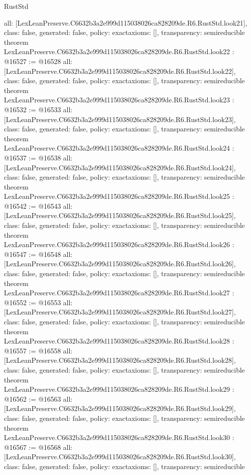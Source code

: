 \begin{lexlean}{RustStd}
\begin{coremodule}
{  all: [LexLeanPreserve.C6632b3a2e999d115038026ca828209de.R6.RustStd.look21],
  class: false,
  generated: false,
  policy: exact{axioms: []},
  transparency: semireducible
}
theorem LexLeanPreserve.C6632b3a2e999d115038026ca828209de.R6.RustStd.look22 : @16527 := @16528 {
  all: [LexLeanPreserve.C6632b3a2e999d115038026ca828209de.R6.RustStd.look22],
  class: false,
  generated: false,
  policy: exact{axioms: []},
  transparency: semireducible
}
theorem LexLeanPreserve.C6632b3a2e999d115038026ca828209de.R6.RustStd.look23 : @16532 := @16533 {
  all: [LexLeanPreserve.C6632b3a2e999d115038026ca828209de.R6.RustStd.look23],
  class: false,
  generated: false,
  policy: exact{axioms: []},
  transparency: semireducible
}
theorem LexLeanPreserve.C6632b3a2e999d115038026ca828209de.R6.RustStd.look24 : @16537 := @16538 {
  all: [LexLeanPreserve.C6632b3a2e999d115038026ca828209de.R6.RustStd.look24],
  class: false,
  generated: false,
  policy: exact{axioms: []},
  transparency: semireducible
}
theorem LexLeanPreserve.C6632b3a2e999d115038026ca828209de.R6.RustStd.look25 : @16542 := @16543 {
  all: [LexLeanPreserve.C6632b3a2e999d115038026ca828209de.R6.RustStd.look25],
  class: false,
  generated: false,
  policy: exact{axioms: []},
  transparency: semireducible
}
theorem LexLeanPreserve.C6632b3a2e999d115038026ca828209de.R6.RustStd.look26 : @16547 := @16548 {
  all: [LexLeanPreserve.C6632b3a2e999d115038026ca828209de.R6.RustStd.look26],
  class: false,
  generated: false,
  policy: exact{axioms: []},
  transparency: semireducible
}
theorem LexLeanPreserve.C6632b3a2e999d115038026ca828209de.R6.RustStd.look27 : @16552 := @16553 {
  all: [LexLeanPreserve.C6632b3a2e999d115038026ca828209de.R6.RustStd.look27],
  class: false,
  generated: false,
  policy: exact{axioms: []},
  transparency: semireducible
}
theorem LexLeanPreserve.C6632b3a2e999d115038026ca828209de.R6.RustStd.look28 : @16557 := @16558 {
  all: [LexLeanPreserve.C6632b3a2e999d115038026ca828209de.R6.RustStd.look28],
  class: false,
  generated: false,
  policy: exact{axioms: []},
  transparency: semireducible
}
theorem LexLeanPreserve.C6632b3a2e999d115038026ca828209de.R6.RustStd.look29 : @16562 := @16563 {
  all: [LexLeanPreserve.C6632b3a2e999d115038026ca828209de.R6.RustStd.look29],
  class: false,
  generated: false,
  policy: exact{axioms: []},
  transparency: semireducible
}
theorem LexLeanPreserve.C6632b3a2e999d115038026ca828209de.R6.RustStd.look30 : @16567 := @16568 {
  all: [LexLeanPreserve.C6632b3a2e999d115038026ca828209de.R6.RustStd.look30],
  class: false,
  generated: false,
  policy: exact{axioms: []},
  transparency: semireducible
}
\end{coremodule}
\end{lexlean}
